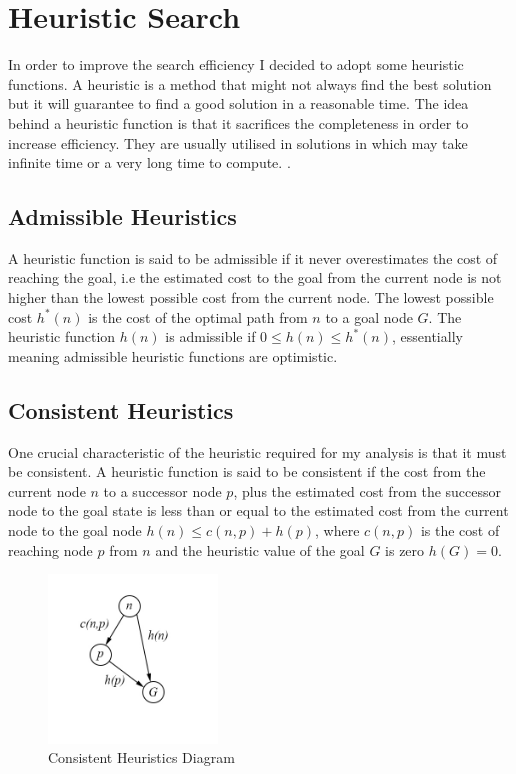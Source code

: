 \documentclass[progress]{cmpreport}
\begin{document}
\section{Heuristic Search} \label{sec1}
In order to improve the search efficiency I decided to adopt some heuristic functions. A heuristic is a method that might not always find the best solution but it will guarantee to find a good solution in a reasonable time. The idea behind a heuristic function is that it sacrifices the completeness in order to increase efficiency. They are usually utilised in solutions in which may take infinite time or a very long time to compute. \citep{DBLP:conf/ai/2014}. 


\subsection{Admissible Heuristics}
A heuristic function is said to be admissible if it never overestimates the cost of reaching the goal, i.e the estimated cost to the goal from the current node is not higher than the lowest possible cost from the current node. The lowest possible cost $h^*(n)$ is the cost of the optimal path from $n$ to a goal node $G$. The heuristic function $h(n)$ is admissible if $0 \leq h(n) \leq h^*(n)$, essentially meaning admissible heuristic functions are optimistic.

\subsection{Consistent Heuristics}
One crucial characteristic of the heuristic required for my analysis is that it must be consistent. A heuristic function is said to be consistent if the cost from the current node $n$ to a successor node $p$, plus the estimated cost from the successor node to the goal state is less than or equal to the estimated cost from the current node to the goal node $h(n)\leq c(n,p) + h(p)$, where $c(n,p)$ is the cost of reaching node $p$ from $n$ and the heuristic value of the goal $G$ is zero $h(G)=0$. 


\begin{figure}[ht]
	\centering
	\includegraphics[width=0.4\textwidth]{consistent}
	\captionsetup{justification=centering}
	\caption{Consistent Heuristics Diagram}
\end{figure}
\end{document}

